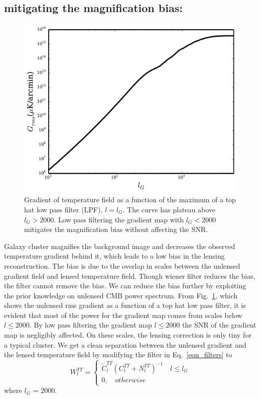   \subsection*{mitigating the magnification bias:}
\begin{figure}[ht]
\includegraphics[width=\columnwidth]{figs/gradient_cut.pdf}
\caption{Gradient of temperature field as a function of the maximum of a top hat low pass filter (LPF), $l = l_{G}$. The curve has plateau above $l_{G} > 2000$. Low pass filtering the gradient map with $l_{G}<2000$ mitigates the magnification bias without affecting the SNR.}
\label{fig:gradient_cut}
\end{figure}
Galaxy cluster magnifies the background image and decreases the observed temperature gradient behind it, which leads to a low bias in the lensing reconstruction.
The bias is due to the overlap in scales between the unlensed gradient field and lensed temperature field. 
Though wiener filter reduces the bias, the filter cannot remove the bias.
We can reduce the bias further by exploiting the prior knowledge on unlensed CMB power spectrum.
 From Fig.~\ref{fig:gradient_cut}, which shows the unlensed rms gradient as a function of a top hat low pass filter, it is evident that most of the power for the gradient map comes from scales below $l \le 2000$.
 By low pass filtering the gradient map $l \le 2000$ the SNR of the gradient map is negligibly affected.
 On these scales, the lensing correction is only tiny for a typical cluster. 
 We get a clean separation between the unlensed gradient and the lensed temperature field by modifying the filter in Eq.~\ref{eqn_filters}  to %
 \begin{equation}
 W^{TT}_{l} =  
    \begin{cases}
        \widetilde{C}^{TT}_{l}(C^{TT}_{l} + N^{TT}_{l})^{-1} \quad l \le l_{G}\\
        0, \quad otherwise
    \end{cases}
\end{equation}
where $l_{G}$ = 2000. 

